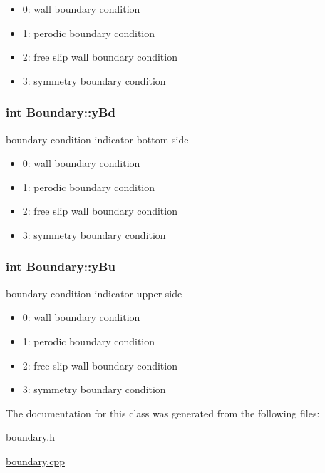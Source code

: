 \begin{itemize}
\item 0: wall boundary condition\item 1: perodic boundary condition\item 2: free slip wall boundary condition\item 3: symmetry boundary condition \end{itemize}
\hypertarget{classBoundary_0329bf6b954b3001418391cc16a9194e}{
\subsubsection[{yBd}]{\setlength{\rightskip}{0pt plus 5cm}int {\bf Boundary::yBd}}}
\label{classBoundary_0329bf6b954b3001418391cc16a9194e}


boundary condition indicator bottom side 

\begin{itemize}
\item 0: wall boundary condition\item 1: perodic boundary condition\item 2: free slip wall boundary condition\item 3: symmetry boundary condition \end{itemize}
\hypertarget{classBoundary_6ccff2a8c5a10104d202504034af9e84}{
\subsubsection[{yBu}]{\setlength{\rightskip}{0pt plus 5cm}int {\bf Boundary::yBu}}}
\label{classBoundary_6ccff2a8c5a10104d202504034af9e84}


boundary condition indicator upper side 

\begin{itemize}
\item 0: wall boundary condition\item 1: perodic boundary condition\item 2: free slip wall boundary condition\item 3: symmetry boundary condition \end{itemize}


The documentation for this class was generated from the following files:\begin{CompactItemize}
\item 
\hyperlink{boundary_8h}{boundary.h}\item 
\hyperlink{boundary_8cpp}{boundary.cpp}\end{CompactItemize}
